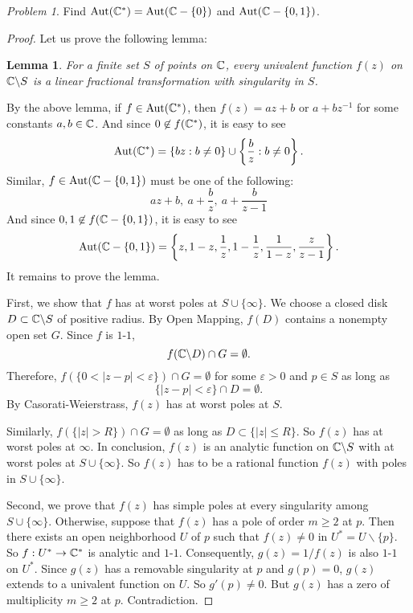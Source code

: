 \documentclass[11pt]{amsart}
\newtheorem{lem}[thm]{Lemma}
\theoremstyle{remark}
\newtheorem{prob}{Problem}[section]
\theoremstyle{definition}
\numberwithin{equation}{section}
\begin{document}
\begin{prob}
    Find $\mathop{\mathrm{Aut}}\nolimits({\mathbb C}^*) = \mathop{\mathrm{Aut}}\nolimits({\mathbb C} -\{0\})$ and $\mathop{\mathrm{Aut}}\nolimits({\mathbb C} - \{0, 1\})$.
\end{prob}

\begin{proof}
    Let us prove the following lemma:

    \begin{lem}\label{MATH506HW123LEM000}
        For a finite set $S$ of points on ${\mathbb C}$, every univalent function $f(z)$ on ${\mathbb C}\backslash S$ is a linear fractional transformation with singularity in $S$.
    \end{lem}

    By the above lemma, if $f\in \mathop{\mathrm{Aut}}\nolimits({\mathbb C}^*)$, then $f(z) = az+b$ or $a + bz^{-1}$ for some constants $a,b\in {\mathbb C}$. And since
    $0\not\in f({\mathbb C}^*)$, it is easy to see
    \[
        \mathop{\mathrm{Aut}}\nolimits({\mathbb C}^*) = \{bz: b\ne 0\} \cup \left\{
        \frac{b}z: b\ne 0
        \right\}.
    \]
    Similar, $f\in \mathop{\mathrm{Aut}}\nolimits({\mathbb C}-\{0,1\})$ must be one of the following:
    \[
        az +b,\ a + \frac{b}z,\ a+ \frac{b}{z-1}
    \]
    And since $0,1\not\in f({\mathbb C}-\{0,1\})$, it is easy to see
    \[
        \mathop{\mathrm{Aut}}\nolimits({\mathbb C} -\{0,1\}) = \left\{
        z, 1-z, \frac{1}{z}, 1 - \frac{1}{z}, \frac{1}{1-z}, \frac{z}{z - 1}
        \right\}.
    \]
    It remains to prove the lemma.

    First, we show that $f$ has at worst poles at $S\cup \{\infty\}$. We choose a closed disk $D\subset {\mathbb C}\backslash S$ of positive radius. By Open Mapping, $f(D)$ contains a nonempty open set $G$. Since $f$ is $1$-$1$,
    \[
        f({\mathbb C}\backslash D) \cap G = \emptyset.
    \]
    Therefore, $f(\{0<|z-p|<\varepsilon\}) \cap G = \emptyset$ for some $\varepsilon > 0$ and $p\in S$ as long as
    \[
        \{|z-p|<\varepsilon\} \cap D = \emptyset.
    \]
    By Casorati-Weierstrass, $f(z)$ has at worst poles at $S$.

    Similarly, $f(\{|z| > R\}) \cap G=\emptyset$ as long as
    $D\subset \{|z| \le R\}$. So $f(z)$ has at worst poles at $\infty$. In conclusion, $f(z)$ is an analytic function on ${\mathbb C}\backslash S$ with at worst poles at $S\cup \{\infty\}$. So $f(z)$ has to be a rational function
    $f(z)$ with poles in $S\cup \{\infty\}$.

    Second, we prove that $f(z)$ has simple poles at every singularity among $S\cup \{\infty\}$.
    Otherwise, suppose that $f(z)$ has a pole of order $m\ge 2$ at $p$. Then
    there exists an open neighborhood $U$ of $p$ such that
    $f(z)\ne 0$ in $U^*=U\backslash \{p\}$. So $f: U^*\to {\mathbb C}^*$ is analytic and $1$-$1$. Consequently, $g(z) = 1/f(z)$ is also $1$-$1$ on $U^*$. Since $g(z)$ has a removable singularity at $p$ and $g(p) = 0$, $g(z)$ extends to a univalent function on $U$. So $g'(p)\ne 0$. But $g(z)$ has a zero of multiplicity $m\ge 2$ at $p$. Contradiction.


\end{proof}
\end{document}
